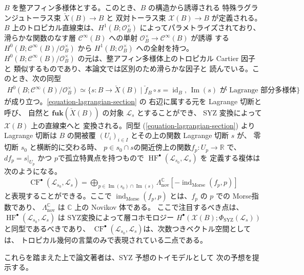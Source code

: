 \documentclass[a4paper,dvipdfmx,reqno,12pt]{amsart}
\theoremstyle{definition}
\newcommand{\opn}[1]{\operatorname{#1}}
\newcommand{\catn}[1]{\mathbf{#1}}
\numberwithin{equation}{section}
\begin{document}
$B$ を整アフィン多様体とする。このとき、$B$ の構造から誘導される
特殊ラグランジュトーラス束 
$\check{X}(B)\to B$ と 
双対トーラス束 $\mathcal{X}(B)\to B$ が定義される。
$B$ 上のトロピカル直線束は、$H^{1}(B;\mathcal{O}^{\times}_B)$
によってパラメトライズされており、滑らかな関数のなす層 
$\mathcal{C}^{\infty}(B)$ への単射 
$\mathcal{O}_{B}^{\times}\to \mathcal{C}^{\infty}(B)$ が誘導
する $H^{0}(B;\mathcal{C}^{\infty}(B)/\mathcal{O}_{B}^{\times})$
から $H^{1}(B;\mathcal{O}^{\times}_B)$ への全射を持つ。
$H^{0}(B;\mathcal{C}^{\infty}(B)/\mathcal{O}_{B}^{\times})$
の元は、整アフィン多様体上のトロピカル Cartier 因子と
類似するものであり、本論文では区別のため滑らかな因子と
読んでいる。このとき、次の同型
\begin{align} \label{equation-lagrangian-section}
H^{0}(B;\mathcal{C}^{\infty}(B)/\mathcal{O}_{B}^{\times})
\simeq \{s\colon B\to \check{X}(B)\mid 
\check{f}_{B}\circ s=\opn{id}_B, \,
\opn{Im}(s) \text{ が Lagrange 部分多様体} \}
\end{align}
が成り立つ。\ref{equation-lagrangian-section} の
右辺に属する元を Lagrange 切断と呼び、
自然と $\catn{fuk}(\check{X}(B))$ の対象
$\mathscr{L}_s$ とすることができ、
SYZ 変換によって$\mathcal{X}(B)$ 上の直線束へと
変換される。同型 (\ref{equation-lagrangian-section})
より Lagrange 切断は $B$ の開被覆 $(U_i)_{i\in I}$ 
とその上の関数
Lagrange 切断 $s$ が、
零切断 $s_0$ と横断的に交わる時、
$p\in s_0\cap s$の開近傍上の関数$f_p\colon U_p\to \mathbb{R}$
で、$df_p=s|_{U_p}$ かつ $p$で孤立特異点を持つもので 
$\opn{HF}^{\bullet}(\mathscr{L}_{s_0},\mathscr{L}_s)$ を
定義する複体は次のようになる。
\begin{align}
\opn{CF}^{\bullet}(\mathscr{L}_{s_0},
\mathscr{L}_s)=\bigoplus_{p\in \opn{Im}(s_0)\cap \opn{Im}(s)}
\Lambda^{\mathbb{C}}_{\mathrm{nov}}[-\opn{ind}_{\mathrm{Morse}}(f_p,p)]
\end{align}
と表現することができる。ここで
$\opn{ind}_{\mathrm{Morse}}(f_p,p)$
とは、$f_p$ の $p$ での Morse指数であり、
$\Lambda^{\mathbb{C}}_{\mathrm{nov}}$ は
$\mathbb{C}$ 上の Novikov 体である。
ここで注目するべき点は、
$\opn{HF}^{\bullet}(\mathscr{L}_{s_0},\mathscr{L}_{s})$
は SYZ変換によって層コホモロジー
$H^{\bullet}(\mathcal{X}(B);
\Phi_{\opn{SYZ}}(\mathscr{L}_{s}))$
と同型であるべきであり、
$\opn{CF}^{\bullet}(\mathscr{L}_{s_0},
\mathscr{L}_s)$は、次数つきベクトル空間としては、
トロピカル幾何の言葉のみで表現されている二点である。

これらを踏まえた上で論文著者は、SYZ 予想のトイモデルとして
次の予想を提示する。
\end{document}
